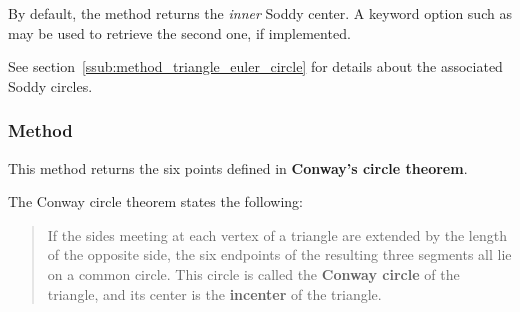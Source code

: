 \medskip
\noindent
By default, the method returns the \emph{inner} Soddy center. A keyword option such as  may be used to retrieve the second one, if implemented.

\medskip
\noindent
See  section~\ref{ssub:method_triangle_euler_circle} for details about the associated Soddy circles.

\vspace{1em}

\vspace{1em}
\begin{minipage}{.5\textwidth}
\end{minipage}
\begin{minipage}{.5\textwidth}
\begin{tkzexample}
\end{tkzexample}
\end{minipage}


\subsubsection{Method } %
\label{ssub:method_triangle_conway_points}

This method returns the six points defined in \textbf{Conway’s circle theorem}.

\medskip
\noindent
The Conway circle theorem states the following:

\begin{quote}
If the sides meeting at each vertex of a triangle are extended by the length of the opposite side, the six endpoints of the resulting three segments all lie on a common circle. This circle is called the \textbf{Conway circle} of the triangle, and its center is the \textbf{incenter} of the triangle.
\end{quote}

